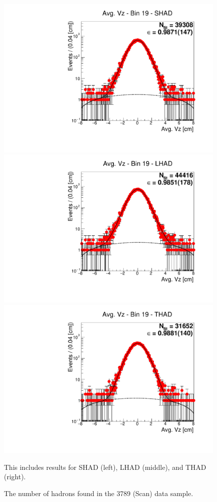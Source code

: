 \begin{figure}[H]
\centering
\includegraphics[scale=0.25]{figures/plots/nonDDbar_fit_results/scan/fit_scan_19_data_SHAD.pdf}
\hspace{-0.5cm}
\includegraphics[scale=0.25]{figures/plots/nonDDbar_fit_results/scan/fit_scan_19_data_LHAD.pdf}
\hspace{-0.5cm}
\includegraphics[scale=0.25]{figures/plots/nonDDbar_fit_results/scan/fit_scan_19_data_THAD.pdf}
\caption{The number of hadrons found in the 3789 (Scan) data sample.}
{This includes results for SHAD (left), LHAD (middle), and THAD (right).}
\label{fig:hadron_fits_scan_19}
\end{figure}

